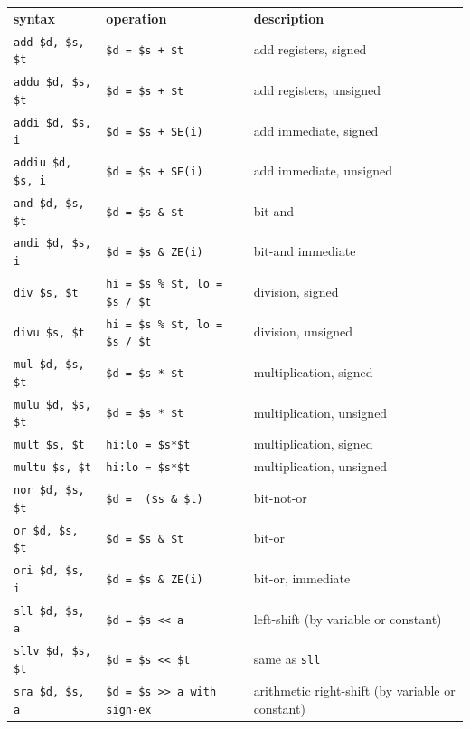 \documentclass[12pt]{article}
\begin{document}
\begin{longtable}{l || l | l}
    \textbf{syntax} & \textbf{operation} & \textbf{description}\\
    \hhline{=#=|=}
    \texttt{add   \$d, \$s, \$t} & \texttt{\$d = \$s + \$t} & add registers, signed\\ \hline
    \texttt{addu  \$d, \$s, \$t} & \texttt{\$d = \$s + \$t} & add registers, unsigned\\ \hline
    \texttt{addi  \$d, \$s, i} & \texttt{\$d = \$s + SE(i)} & add immediate, signed\\ \hline
    \texttt{addiu \$d, \$s, i} & \texttt{\$d = \$s + SE(i)} & add immediate, unsigned\\ \hline
    \texttt{and   \$d, \$s, \$t} & \texttt{\$d = \$s \& \$t} & bit-and\\ \hline
    \texttt{andi  \$d, \$s, i} & \texttt{\$d = \$s \& ZE(i)} & bit-and immediate\\ \hline
    \texttt{div   \$s, \$t} & \texttt{hi = \$s \% \$t, lo = \$s / \$t} & division, signed\\ \hline
    \texttt{divu  \$s, \$t} & \texttt{hi = \$s \% \$t, lo = \$s / \$t} & division, unsigned\\ \hline
    \texttt{mul   \$d, \$s, \$t} & \texttt{\$d = \$s * \$t} & multiplication, signed\\ \hline
    \texttt{mulu  \$d, \$s, \$t} & \texttt{\$d = \$s * \$t} & multiplication, unsigned\\ \hline
    \texttt{mult  \$s, \$t} & \texttt{hi:lo = \$s*\$t} & multiplication, signed\\ \hline
    \texttt{multu \$s, \$t} & \texttt{hi:lo = \$s*\$t} & multiplication, unsigned\\ \hline
    \texttt{nor   \$d, \$s, \$t} & \texttt{\$d = ~(\$s \& \$t)} & bit-not-or\\ \hline
    \texttt{or    \$d, \$s, \$t} & \texttt{\$d = \$s \& \$t} & bit-or\\ \hline
    \texttt{ori   \$d, \$s, i} & \texttt{\$d = \$s \& ZE(i)} & bit-or, immediate\\ \hline
    \texttt{sll   \$d, \$s, a} & \texttt{\$d = \$s << a} & left-shift (by variable or constant)\\ \hline
    \texttt{sllv  \$d, \$s, \$t} & \texttt{\$d = \$s << \$t} & same as \texttt{sll}\\ \hline
    \texttt{sra   \$d, \$s, a} & \texttt{\$d = \$s >> a  with sign-ex} & arithmetic right-shift (by variable or constant)\\ \hline

\end{longtable}
\end{document}
